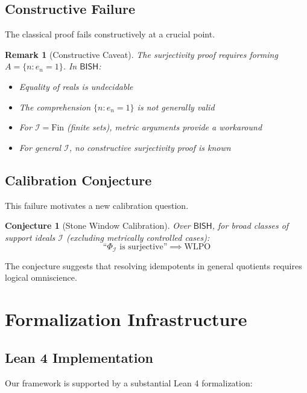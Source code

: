 \documentclass[11pt]{article}
\newtheorem{conjecture}[theorem]{Conjecture}
\newtheorem{remark}[theorem]{Remark}
\newcommand{\WLPO}{\mathrm{WLPO}}
\newcommand{\BISH}{\mathsf{BISH}}
\begin{document}
\subsection{Constructive Failure}

The classical proof fails constructively at a crucial point.

\begin{remark}[Constructive Caveat]
The surjectivity proof requires forming $A = \{n : e_n = 1\}$. In $\BISH$:
\begin{itemize}
\item Equality of reals is undecidable
\item The comprehension $\{n : e_n = 1\}$ is not generally valid
\item For $\mathcal{I} = \text{Fin}$ (finite sets), metric arguments provide a workaround
\item For general $\mathcal{I}$, no constructive surjectivity proof is known
\end{itemize}
\end{remark}

\subsection{Calibration Conjecture}

This failure motivates a new calibration question.

\begin{conjecture}[Stone Window Calibration]\label{conj:stone}
Over $\BISH$, for broad classes of support ideals $\mathcal{I}$ (excluding metrically controlled cases):
\[
\text{``}\Phi_{\mathcal{I}} \text{ is surjective''} \implies \WLPO
\]
\end{conjecture}

The conjecture suggests that resolving idempotents in general quotients requires logical omniscience.

\section{Formalization Infrastructure}

\subsection{Lean 4 Implementation}

Our framework is supported by a substantial Lean 4 formalization:
\end{document}

